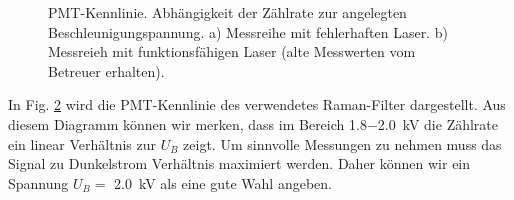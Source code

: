\documentclass[11 pt]{article}
\begin{document}
\begin{figure}[htbp]
    \centering
    \begin{subfigure}{0.45\textwidth}
        \centering
        \caption{}
        \label{fig:fehler}
    \end{subfigure}
    \hfill
    \begin{subfigure}{0.45\textwidth}
        \centering
        \caption{}
        \label{fig:gegeben}
    \end{subfigure}
    \caption{PMT-Kennlinie. Abhängigkeit der Zählrate zur angelegten Beschleunigungspannung. a) Messreihe mit fehlerhaften Laser. b) Messreieh mit funktionsfähigen Laser (alte Messwerten vom Betreuer erhalten).}
    \label{fig:PMT_Kennlinie}
\end{figure}

In Fig. \ref{fig:gegeben} wird die PMT-Kennlinie des verwendetes Raman-Filter dargestellt. Aus diesem Diagramm können wir merken, dass im Bereich \num{1.8}$-$\SI{2.0}{\kilo\volt} die Zählrate ein linear Verhältnis zur $U_B$ zeigt. Um sinnvolle Messungen zu nehmen muss das Signal zu Dunkelstrom Verhältnis maximiert werden. Daher können wir ein Spannung $U_B =$ \SI{2.0}{\kilo\volt} als eine gute Wahl angeben.  
\end{document}
